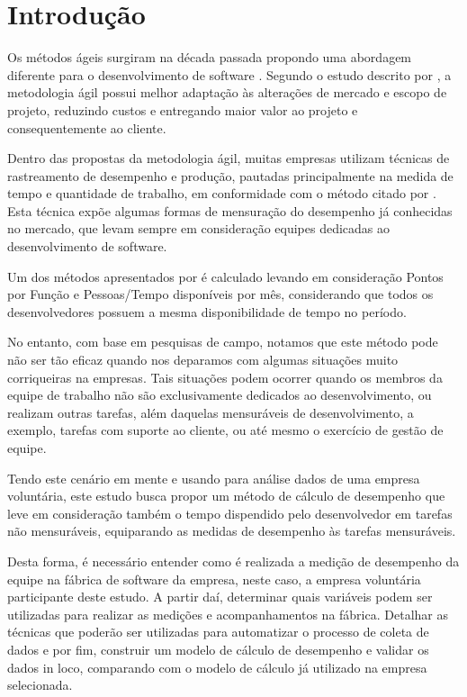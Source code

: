 \section{Introdução}
Os métodos ágeis surgiram na década passada propondo uma abordagem diferente para o desenvolvimento de software \cite{sato2007usoMetricas}. Segundo o estudo descrito por  \citeauthor{sato2007usoMetricas}, a metodologia ágil possui melhor adaptação às alterações de mercado e escopo de projeto, reduzindo custos e entregando maior valor ao projeto e consequentemente ao cliente.\par

Dentro das propostas da metodologia ágil, muitas empresas utilizam técnicas de rastreamento de desempenho e produção, pautadas principalmente na medida de tempo e quantidade de trabalho, em conformidade com o método citado por . Esta técnica expõe algumas formas de mensuração do desempenho já conhecidas no mercado, que levam sempre em consideração equipes dedicadas ao desenvolvimento de software.\par 

Um dos métodos apresentados por  é calculado levando em consideração Pontos por Função e Pessoas/Tempo disponíveis por mês, considerando que todos os desenvolvedores possuem a mesma disponibilidade de tempo no período.

No entanto, com base em pesquisas de campo, notamos que este método pode não ser tão eficaz quando nos deparamos com algumas situações muito corriqueiras na empresas. Tais situações podem ocorrer quando os membros da equipe de trabalho não são exclusivamente dedicados ao desenvolvimento, ou realizam outras tarefas, além daquelas mensuráveis de desenvolvimento, a exemplo, tarefas com suporte ao cliente, ou até mesmo o exercício de gestão de equipe.\par

Tendo este cenário em mente e usando para análise dados de uma empresa voluntária, este estudo busca propor um método de cálculo de desempenho que leve em consideração também o tempo dispendido pelo desenvolvedor em tarefas não mensuráveis, equiparando as medidas de desempenho às tarefas mensuráveis.\par

Desta forma, é necessário entender como é realizada a medição de desempenho da equipe na fábrica de software da empresa, neste caso, a empresa voluntária participante deste estudo. A partir daí, determinar quais variáveis podem ser utilizadas para realizar as medições e acompanhamentos na fábrica. Detalhar as técnicas que poderão ser utilizadas para automatizar o processo de coleta de dados e por fim, construir um modelo de cálculo de desempenho e validar os dados in loco, comparando com o modelo de cálculo já utilizado na empresa selecionada.